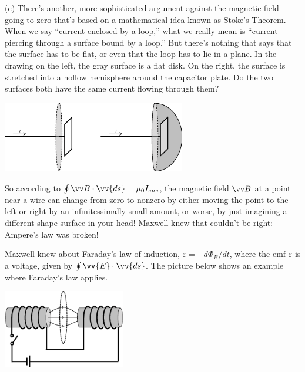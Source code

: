 (e)  There's another, more sophisticated argument against the magnetic field going to zero that's based on a mathematical idea known as Stoke's Theorem.  When we say ``current enclosed by a loop,'' what we really mean is ``current piercing through a surface bound by a loop.'' But there's nothing that says that the surface has to be flat, or even that the loop has to lie in a plane.  In the drawing on the left, the gray surface is a flat disk.  On the right, the surface is stretched into a hollow hemisphere around the capacitor plate.  Do the two surfaces both have the same current flowing through them?
\begin{center}
\vspace{-0.1in}
    \includegraphics[width=0.6\textwidth]{deriving_em_waves/two_surfaces.eps}
\vspace{-0.1in}
\end{center}

So according to $\oint \vv B \cdot \vv{ds} = \mu_0I_{enc}$, the magnetic field $\vv B$ at a point near a wire can change from zero to nonzero by either moving the point to the left or right by an infinitessimally small amount, or worse, by just imagining a different shape surface in your head!  Maxwell knew that couldn't be right: Ampere's law was broken!

Maxwell knew about Faraday's law of induction, $\varepsilon=-d \Phi_B/dt$, where the emf $\varepsilon$ is a voltage, given by $\oint \vv{E} \cdot \vv{ds}$.  The picture below shows an example where Faraday's law applies.  
\begin{center}
\vspace{-0.1in}
    \includegraphics[width=0.4\textwidth]{deriving_em_waves/faradays_law.eps}
\vspace{-0.1in}
\end{center}

